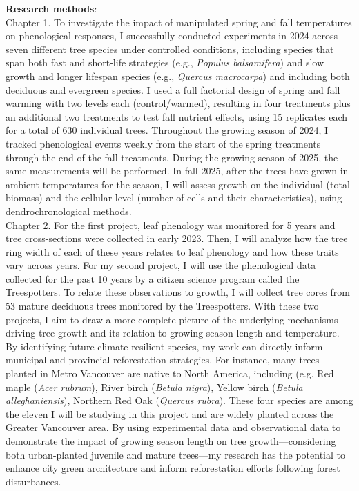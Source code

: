 \documentclass[11pt,letter]{article}
\begin{document}
\par
\textbf{Research methods}: \\
Chapter 1. To investigate the impact of manipulated spring and fall temperatures on phenological responses, I successfully conducted experiments in 2024 across seven different tree species under controlled conditions, including species that span both fast and short-life strategies (e.g., \textit{Populus balsamifera}) and slow growth and longer lifespan species (e.g., \textit{Quercus macrocarpa}) and including both deciduous and evergreen species. \citep{jonsson_annual_2010}  I used a full factorial design of spring and fall warming with two levels each (control/warmed), resulting in four treatments plus an additional two treatments to test fall nutrient effects, using 15 replicates each for a total of 630 individual trees. Throughout the growing season of 2024, I tracked phenological events weekly from the start of the spring treatments through the end of the fall treatments. During the growing season of 2025, the same measurements will be performed. In fall 2025, after the trees have grown in ambient temperatures for the season, I will assess growth on the individual (total biomass) and the cellular level (number of cells and their characteristics), using dendrochronological methods.\\
Chapter 2. For the first project, leaf phenology was monitored for 5 years and tree cross-sections were collected in early 2023. Then, I will analyze how the tree ring width of each of these years relates to leaf phenology and how these traits vary across years. For my second project, I will use the phenological data collected for the past 10 years by a citizen science program called the Treespotters. To relate these observations to growth, I will collect tree cores from 53 mature deciduous trees monitored by the Treespotters. With these two projects, I aim to draw a more complete picture of the underlying mechanisms driving tree growth and its relation to growing season length and temperature. By identifying future climate-resilient species, my work can directly inform municipal and provincial reforestation strategies. For instance, many trees planted in Metro Vancouver are native to North America, including (e.g. Red maple (\textit{Acer rubrum}), River birch (\textit{Betula nigra}), Yellow birch (\textit{Betula alleghaniensis}), Northern Red Oak (\textit{Quercus rubra}). These four species are among the eleven I will be studying in this project and are widely planted across the Greater Vancouver area. By using experimental data and observational data to demonstrate the impact of growing season length on tree growth—considering both urban-planted juvenile and mature trees—my research has the potential to enhance city green architecture and inform reforestation efforts following forest disturbances.\\
\end{document}
